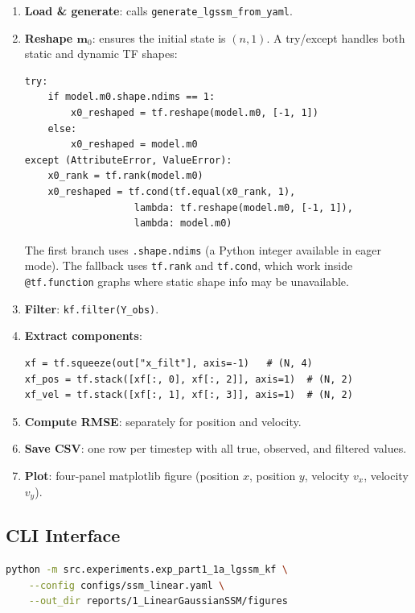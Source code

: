 \documentclass[11pt,a4paper]{article}
\newcommand{\py}[1]{\lstinline[style=py]{#1}}
\begin{document}
\begin{enumerate}
\item \textbf{Load \& generate}: calls \py{generate_lgssm_from_yaml}.
\item \textbf{Reshape $\bm{m}_0$}: ensures the initial state is
  $(n, 1)$.  A try/except handles both static and dynamic TF shapes:

\begin{lstlisting}[caption={Shape handling for dynamic graphs.}]
try:
    if model.m0.shape.ndims == 1:
        x0_reshaped = tf.reshape(model.m0, [-1, 1])
    else:
        x0_reshaped = model.m0
except (AttributeError, ValueError):
    x0_rank = tf.rank(model.m0)
    x0_reshaped = tf.cond(tf.equal(x0_rank, 1),
                   lambda: tf.reshape(model.m0, [-1, 1]),
                   lambda: model.m0)
\end{lstlisting}

The first branch uses \py{.shape.ndims} (a Python integer available
in eager mode).  The fallback uses \py{tf.rank} and \py{tf.cond},
which work inside \py{@tf.function} graphs where static shape info
may be unavailable.

\item \textbf{Filter}: \py{kf.filter(Y_obs)}.
\item \textbf{Extract components}:

\begin{lstlisting}[caption={Splitting position and velocity.}]
xf = tf.squeeze(out["x_filt"], axis=-1)   # (N, 4)
xf_pos = tf.stack([xf[:, 0], xf[:, 2]], axis=1)  # (N, 2)
xf_vel = tf.stack([xf[:, 1], xf[:, 3]], axis=1)  # (N, 2)
\end{lstlisting}

\item \textbf{Compute RMSE}: separately for position and velocity.
\item \textbf{Save CSV}: one row per timestep with all true, observed,
  and filtered values.
\item \textbf{Plot}: four-panel matplotlib figure (position $x$,
  position $y$, velocity $v_x$, velocity $v_y$).
\end{enumerate}

\subsection{CLI Interface}

\begin{lstlisting}[language=bash,style=py]
python -m src.experiments.exp_part1_1a_lgssm_kf \
    --config configs/ssm_linear.yaml \
    --out_dir reports/1_LinearGaussianSSM/figures
\end{lstlisting}
\end{document}
